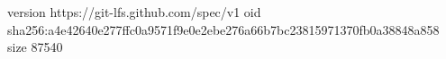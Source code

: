 version https://git-lfs.github.com/spec/v1
oid sha256:a4e42640e277ffc0a9571f9e0e2ebe276a66b7bc23815971370fb0a38848a858
size 87540

